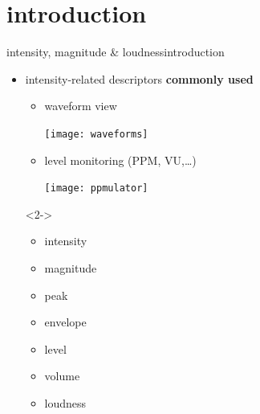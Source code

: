     \section[intro]{introduction}
        \begin{frame}{intensity, magnitude \& loudness}{introduction}
            \begin{itemize}
                \item   intensity-related descriptors \textbf{commonly used}
                    \begin{itemize}
                        \item	waveform view
                        
                            \texttt{[image: waveforms]}
                        \item	level monitoring (PPM, VU,\ldots)
                        
                            \texttt{[image: ppmulator]}
                     \end{itemize}
            \end{itemize}
            
            \vspace{-3mm}
            \begin{itemize}
                \item[]<2-> 
                \vspace{-3mm}
                 \begin{itemize}
                    \item	intensity
                    \item	magnitude
                    \item	peak
                    \item	envelope
                    \item	level
                    \item	volume
                    \item	loudness
                 \end{itemize}
            \end{itemize}
            
                \vspace{-3mm}
        \end{frame}

